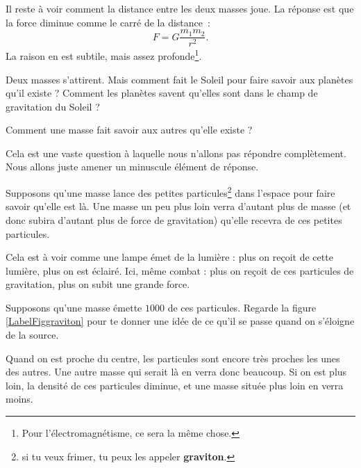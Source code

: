 \documentclass[a4paper,12pt]{book}
\theoremstyle{mes_exemples}	\newtheorem{exemple}[numtho]{Exemple}
\theoremstyle{mes_tho}
\newcommand{\defe}[2]{\textbf{#1}\index{#2}}
\begin{document}
Il reste à voir comment la distance entre les deux masses joue. La réponse est que la force diminue comme le carré de la distance~:
\begin{equation}	\label{PgForceGrav}
	F=G\frac{ m_1m_2 }{ r^2 }.
\end{equation}
La raison en est subtile, mais assez profonde\footnote{Pour l'électromagnétisme, ce sera la même chose.}. 


\begin{pourquoidonc}
	Deux masses s'attirent. Mais comment fait le Soleil pour faire savoir aux planètes qu'il existe ? Comment les planètes savent qu'elles sont dans le champ de gravitation du Soleil ?

	Comment une masse fait savoir aux autres qu'elle existe ?
\end{pourquoidonc}
Cela est une vaste question à laquelle nous n'allons pas répondre complètement. Nous allons juste amener un minuscule élément de réponse. 

Supposons qu'une masse lance des petites particules\footnote{si tu veux frimer, tu peux les appeler \defe{graviton}{Graviton}.} dans l'espace pour faire savoir qu'elle est là. Une masse un peu plus loin \og verra\fg{} d'autant plus de masse (et donc subira d'autant plus de force de gravitation) qu'elle recevra de ces petites particules.

Cela est à voir comme une lampe émet de la lumière : plus on reçoit de cette lumière, plus on est éclairé. Ici, même combat : plus on reçoit de ces particules de gravitation, plus on subit une grande force.

Supposons qu'une masse émette $1000$ de ces particules. Regarde la figure \ref{LabelFiggraviton} pour te donner une idée de ce qu'il se passe quand on s'éloigne de la source.
\newcommand{\CaptionFiggraviton}{Les petites particules de gravitation. Plus on s'éloigne, plus elles s'espacent les unes des autres}


Quand on est proche du centre, les particules sont encore très proches les unes des autres. Une autre masse qui serait là en verra donc beaucoup. Si on est plus loin, la densité de ces particules diminue, et une masse située plus loin en verra moins. 
\end{document}
